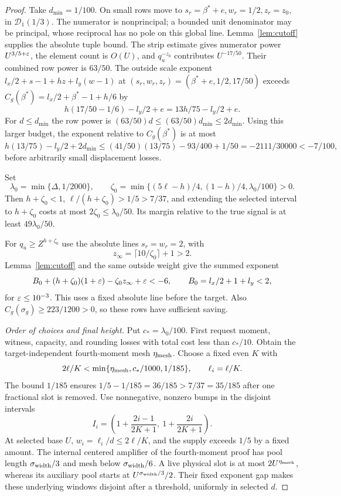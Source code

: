 \begin{proof}
Take $d_{\min}=1/100$. On small rows move to $s_r=\beta^*+e,w_r=1/2,z_r=z_0$, in $\mathcal D_1(1/3)$. The numerator is nonprincipal; a bounded unit denominator may be principal, whose reciprocal has no pole on this global line. Lemma~\ref{lem:cutoff} supplies the absolute tuple bound. The strip estimate  gives numerator power $U^{3/5+\varepsilon}$, the element count is $O(U)$, and $q_u^{-z_0}$ contributes $U^{-17/50}$. Their combined row power is $63/50$. The outside scale exponent $l_x/2+s-1+hz+l_y(w-1)$ at $(s_r,w_r,z_r)=(\beta^*+e,1/2,17/50)$ exceeds $C_g(\beta^*)=l_x/2+\beta^*-1+h/6$ by
\[
 h(17/50-1/6)-l_y/2+e=13h/75-l_y/2+e.
\]
For $d\le d_{\min}$ the row power is $(63/50)d\le(63/50)d_{\min}\le2d_{\min}$. Using this larger budget, the exponent relative to $C_g(\beta^*)$ is at most
\begin{equation}\label{eq:small}
 h(13/75)-l_y/2+2d_{\min}
 \le(41/50)(13/75)-93/400+1/50
 =-2111/30000<-7/100,
\end{equation}
before arbitrarily small displacement losses.

Set
\begin{equation}\label{eq:zeta}
 \lambda_0=\min\{\Delta,1/2000\},\qquad
 \zeta_0=\min\{(5\ell-h)/4,(1-h)/4,\lambda_0/100\}>0.
\end{equation}
Then $h+\zeta_0<1$, $\ell/(h+\zeta_0)>1/5>7/37$, and extending the selected interval to $h+\zeta_0$ costs at most $2\zeta_0\le\lambda_0/50$. Its margin relative to the true signal is at least $49\lambda_0/50$.

For $q_u\ge Z^{h+\zeta_0}$ use the absolute lines $s_r=w_r=2$, with
\[
 z_\infty=\lceil10/\zeta_0\rceil+1>2.
\]
Lemma~\ref{lem:cutoff} and the same outside weight give the summed exponent
\[
 B_0+(h+\zeta_0)(1+\varepsilon)-\zeta_0 z_\infty+\varepsilon<-6,
 \qquad B_0=l_x/2+1+l_y<2,
\]
for $\varepsilon\le10^{-3}$. This uses a fixed absolute line before the target. Also $C_g(\sigma_g)\ge223/1200>0$, so these rows have sufficient saving.

\emph{Order of choices and final height.}
Put $c_*=\lambda_0/100$. First request moment, witness, capacity, and rounding losses with total cost less than $c_*/10$. Obtain the target-independent fourth-moment mesh $\eta_{\rm mesh}$. Choose a fixed even $K$ with
\begin{equation}\label{eq:Kchoice}
 2\ell/K<\min\{\eta_{\rm mesh},c_*/1000,1/185\},\qquad\ell_i=\ell/K.
\end{equation}
The bound $1/185$ ensures
$1/5-1/185=36/185>7/37=35/185$ after one fractional slot is removed.
Use nonnegative, nonzero bumps in the disjoint intervals
\[
 I_i=\left(1+\frac{2i-1}{2K+1},\ 1+\frac{2i}{2K+1}\right).
\]
At selected base $U$, $w_i=\ell_i/d\le2\ell/K$, and the supply exceeds $1/5$ by a fixed amount. The internal centered amplifier of the fourth-moment proof has pool length $\sigma_{\rm width}/3$ and mesh below $\sigma_{\rm width}/6$. A live physical slot is at most $2U^{\eta_{\rm mesh}}$, whereas its auxiliary pool starts at $U^{\sigma_{\rm width}/3}/2$. Their fixed exponent gap makes these underlying windows disjoint after a threshold, uniformly in selected $d$.


\end{proof}
